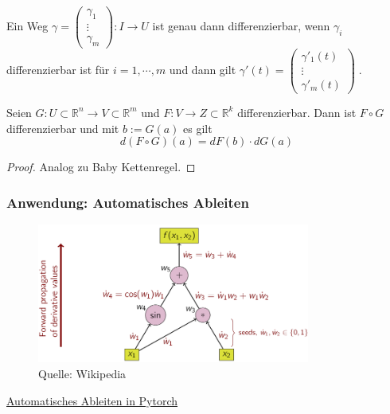 \begin{Bemerkung}
Ein Weg $\gamma =  \begin{pmatrix} \gamma_1  \\ \vdots \\ \gamma_m \end{pmatrix} : I \to U$ ist genau dann differenzierbar, wenn $\gamma_i$ differenzierbar ist für $i= 1, \cdots, m$ und dann gilt $\gamma'(t) =   \begin{pmatrix} \gamma'_1(t)  \\ \vdots \\ \gamma'_m(t) \end{pmatrix} \; .$
\end{Bemerkung}



\begin{Satz}[Kettenregel]
Seien $G:  U \subset \mathbb{R}^n \to V \subset \mathbb{R}^m$ und $F: V \to Z \subset \mathbb{R}^k$ differenzierbar. Dann ist $F \circ G$ differenzierbar und mit $b := G(a)$ es gilt
$$ d(F \circ G)(a) = dF(b) \cdot dG(a) $$
\end{Satz}
\begin{proof}
Analog zu Baby Kettenregel.
\end{proof}
\subsubsection*{Anwendung: Automatisches Ableiten} 

\begin{figure}[H]
      \centering
    \includegraphics[width=0.8\textwidth]{images/ad.png}
      \caption{Quelle: Wikipedia}
\end{figure}



\href{https://pytorch.org/tutorials/beginner/blitz/autograd_tutorial.html}{Automatisches Ableiten  in Pytorch}








